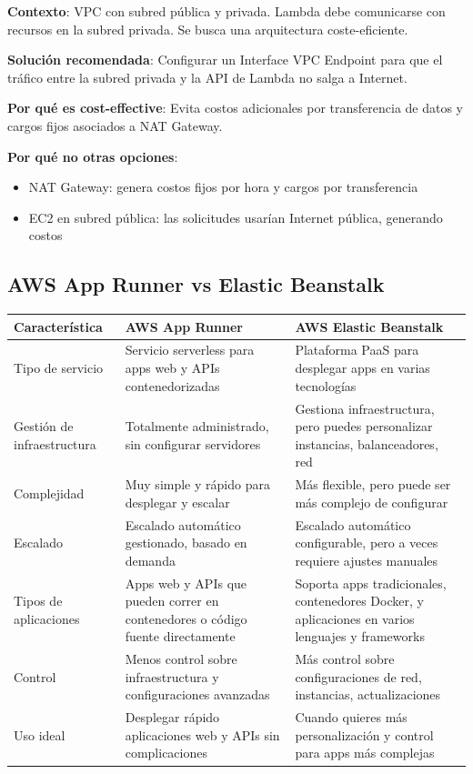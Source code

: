 \documentclass[12pt,a4paper]{report}
\begin{document}
\begin{conceptbox}
\textbf{Contexto}: VPC con subred pública y privada. Lambda debe comunicarse con recursos en la subred privada. Se busca una arquitectura coste-eficiente.

\textbf{Solución recomendada}: Configurar un Interface VPC Endpoint para que el tráfico entre la subred privada y la API de Lambda no salga a Internet.

\textbf{Por qué es cost-effective}: Evita costos adicionales por transferencia de datos y cargos fijos asociados a NAT Gateway.

\textbf{Por qué no otras opciones}:
\begin{itemize}
    \item NAT Gateway: genera costos fijos por hora y cargos por transferencia
    \item EC2 en subred pública: las solicitudes usarían Internet pública, generando costos
\end{itemize}
\end{conceptbox}

\subsection{AWS App Runner vs Elastic Beanstalk}

\begin{center}
\begin{longtable}{|p{3cm}|p{5.5cm}|p{5.5cm}|}
\hline
\cellcolor{awsblue!20}\textbf{Característica} & \cellcolor{awsblue!20}\textbf{AWS App Runner} & \cellcolor{awsblue!20}\textbf{AWS Elastic Beanstalk} \\
\hline
Tipo de servicio & Servicio serverless para apps web y APIs contenedorizadas & Plataforma PaaS para desplegar apps en varias tecnologías \\
\hline
Gestión de infraestructura & Totalmente administrado, sin configurar servidores & Gestiona infraestructura, pero puedes personalizar instancias, balanceadores, red \\
\hline
Complejidad & Muy simple y rápido para desplegar y escalar & Más flexible, pero puede ser más complejo de configurar \\
\hline
Escalado & Escalado automático gestionado, basado en demanda & Escalado automático configurable, pero a veces requiere ajustes manuales \\
\hline
Tipos de aplicaciones & Apps web y APIs que pueden correr en contenedores o código fuente directamente & Soporta apps tradicionales, contenedores Docker, y aplicaciones en varios lenguajes y frameworks \\
\hline
Control & Menos control sobre infraestructura y configuraciones avanzadas & Más control sobre configuraciones de red, instancias, actualizaciones \\
\hline
Uso ideal & Desplegar rápido aplicaciones web y APIs sin complicaciones & Cuando quieres más personalización y control para apps más complejas \\
\hline
\end{longtable}
\end{center}
\end{document}
